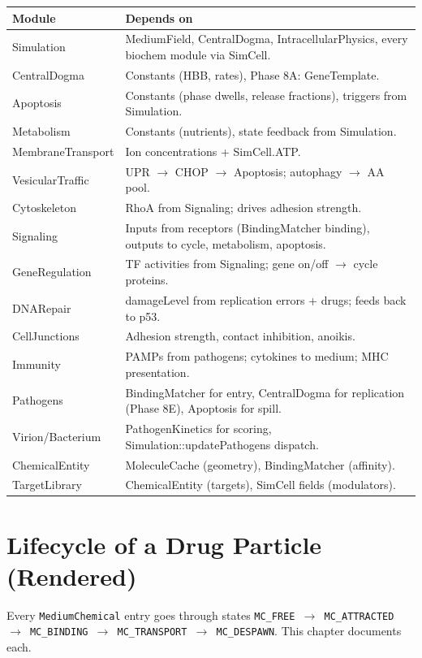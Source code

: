\documentclass[11pt,letterpaper,twoside,openany]{book}
\newcommand{\code}[1]{\texttt{#1}}
\begin{document}
\begin{longtable}{p{3.3cm}p{10.5cm}}
\toprule
\textbf{Module} & \textbf{Depends on}\\ \midrule
Simulation       & MediumField, CentralDogma, IntracellularPhysics, every biochem module via SimCell.\\
CentralDogma     & Constants (HBB, rates), Phase 8A: GeneTemplate.\\
Apoptosis        & Constants (phase dwells, release fractions), triggers from Simulation.\\
Metabolism       & Constants (nutrients), state feedback from Simulation.\\
MembraneTransport& Ion concentrations + SimCell.ATP.\\
VesicularTraffic & UPR $\to$ CHOP $\to$ Apoptosis; autophagy $\to$ AA pool.\\
Cytoskeleton     & RhoA from Signaling; drives adhesion strength.\\
Signaling        & Inputs from receptors (BindingMatcher binding), outputs to cycle, metabolism, apoptosis.\\
GeneRegulation   & TF activities from Signaling; gene on/off $\to$ cycle proteins.\\
DNARepair        & damageLevel from replication errors + drugs; feeds back to p53.\\
CellJunctions    & Adhesion strength, contact inhibition, anoikis.\\
Immunity         & PAMPs from pathogens; cytokines to medium; MHC presentation.\\
Pathogens        & BindingMatcher for entry, CentralDogma for replication (Phase 8E), Apoptosis for spill.\\
Virion/Bacterium & PathogenKinetics for scoring, Simulation::updatePathogens dispatch.\\
ChemicalEntity   & MoleculeCache (geometry), BindingMatcher (affinity).\\
TargetLibrary    & ChemicalEntity (targets), SimCell fields (modulators).\\
\bottomrule
\end{longtable}

\chapter{Lifecycle of a Drug Particle (Rendered)}
\label{ch:drug-particle-life}

Every \code{MediumChemical} entry goes through states
\code{MC\_FREE $\to$ MC\_ATTRACTED $\to$ MC\_BINDING $\to$
MC\_TRANSPORT $\to$ MC\_DESPAWN}. This chapter documents each.
\end{document}
